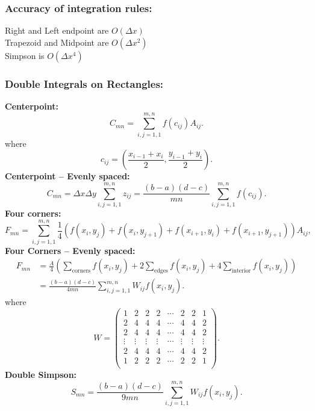\subsubsection*{Accuracy of integration rules:}
Right and Left endpoint are $O(\Delta x)$\\
Trapezoid and Midpoint are $O(\Delta x^2)$\\
Simpson is $O(\Delta x^4)$


\subsubsection*{Double Integrals on Rectangles:}
{\bf Centerpoint:}
$$
    C_{mn} = \sum_{i,j=1,1}^{m,n} f(c_{ij}) A_{ij}.
$$
where
$$
 c_{ij} = \left( \frac{x_{i-1} + x_i}{2}, \frac{y_{i-1} + y_i}{2} \right).
$$
{\bf Centerpoint -- Evenly spaced:}
$$
    C_{mn} = \Delta x \Delta y \sum_{i,j=1,1}^{m,n} z_{ij} = \frac{(b-a)(d-c)}{mn} \sum_{i,j=1,1}^{m,n} f(c_{ij}).
$$
{\bf Four corners:}
$$
   F_{mn} =   \sum_{i,j=1,1}^{m,n} \frac{1}{4}
            \left( f(x_i,y_j) +
                   f(x_i,y_{j+1}) +
                   f(x_{i+1},y_i) +
                   f(x_{i+1},y_{j+1}) \right)    A_{ij},
$$
{\bf Four Corners -- Evenly spaced:}
\begin{equation*}
\begin{split}
F_{mn} &= \frac{A}{4} \left( \sum_{\text{corners}} f(x_i,y_j)
                   + 2 \sum_{\text{edges}} f(x_i,y_j)
                   + 4 \sum_{\text{interior}} f(x_i,y_j)
                         \right)\\
       &= \frac{(b-a)(d-c)}{4mn} \sum_{i,j = 1,1}^{m,n}
                       W_{ij} f(x_i,y_j).
\end{split}
\end{equation*}
where
$$
W = \left( \begin{array}{cccccccc}
           1 & 2 & 2 & 2 & \cdots & 2 & 2 & 1 \\
           2 & 4 & 4 & 4 & \cdots & 4 & 4 & 2 \\
           2 & 4 & 4 & 4 & \cdots & 4 & 4 & 2 \\
        \vdots & \vdots & \vdots & \vdots & \cdots & \vdots & \vdots & \vdots \\
           2 & 4 & 4 & 4 & \cdots & 4 & 4 & 2 \\
           1 & 2 & 2 & 2 & \cdots & 2 & 2 & 1 \\
           \end{array}
    \right).
$$
{\bf Double Simpson:}
$$
     S_{mn} = \frac{(b-a)(d-c)}{9mn} \sum_{i,j = 1,1}^{m,n}
                       W_{ij} f(x_i,y_j).
$$
